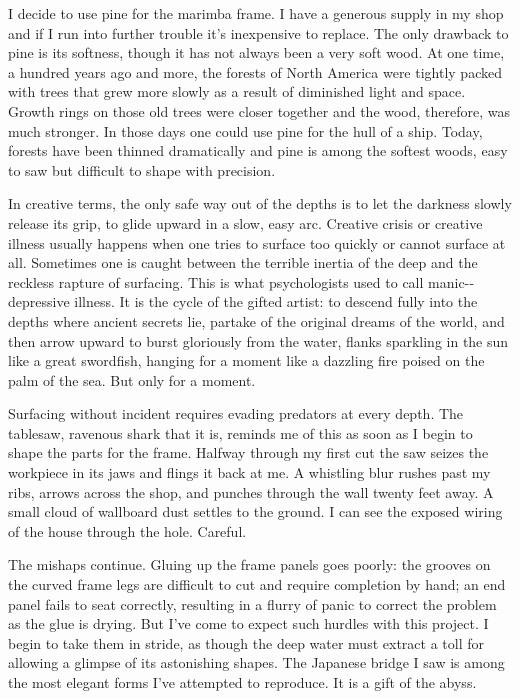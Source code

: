 \documentclass[letterpaper,10pt,headsepline]{scrreprt}
\begin{document}
I decide to use pine for the marimba frame. I have a generous supply in my shop and if I run into further trouble it’s inexpensive to replace. The only drawback to pine is its softness, though it has not always been a very soft wood. At one time, a hundred years ago and more, the forests of North America were tightly packed with trees that grew more slowly as a result of diminished light and space. Growth rings on those old trees were closer together and the wood, therefore, was much stronger. In those days one could use pine for the hull of a ship. Today, forests have been thinned dramatically and pine is among the softest woods, easy to saw but difficult to shape with precision.

In creative terms, the only safe way out of the depths is to let the darkness slowly release its grip, to glide upward in a slow, easy arc. Creative crisis or creative illness usually happens when one tries to surface too quickly or cannot surface at all. Sometimes one is caught between the terrible inertia of the deep and the reckless rapture of surfacing. This is what psychologists used to call manic-­depressive illness. It is the cycle of the gifted artist: to descend fully into the depths where ancient secrets lie, partake of the original dreams of the world, and then arrow upward to burst gloriously from the water, flanks sparkling in the sun like a great swordfish, hanging for a moment like a dazzling fire poised on the palm of the sea. But only for a moment.

Surfacing without incident requires evading predators at every depth. The tablesaw, ravenous shark that it is, reminds me of this as soon as I begin to shape the parts for the frame. Halfway through my first cut the saw seizes the workpiece in its jaws and flings it back at me. A whistling blur rushes past my ribs, arrows across the shop, and punches through the wall twenty feet away. A small cloud of wallboard dust settles to the ground. I can see the exposed wiring of the house through the hole. Careful.

The mishaps continue. Gluing up the frame panels goes poorly: the grooves on the curved frame legs are difficult to cut and require completion by hand; an end panel fails to seat correctly, resulting in a flurry of panic to correct the problem as the glue is drying. But I’ve come to expect such hurdles with this project. I begin to take them in stride, as though the deep water must extract a toll for allowing a glimpse of its astonishing shapes. The Japanese bridge I saw is among the most elegant forms I’ve attempted to reproduce. It is a gift of the abyss.
\end{document}
